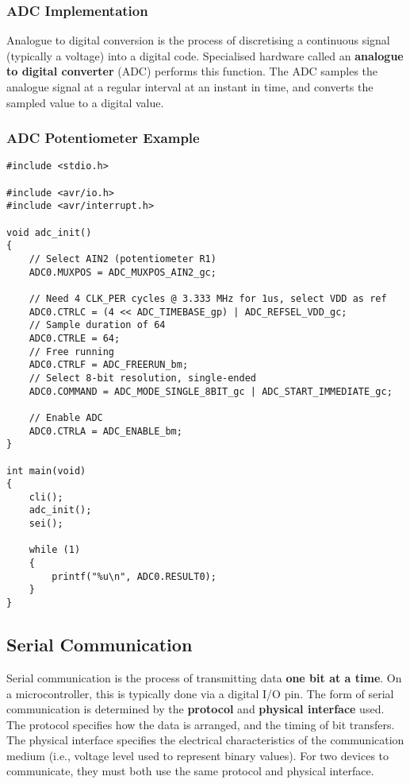 \documentclass{article}
\begin{document}
\subsubsection{ADC Implementation}
Analogue to digital conversion is the process of discretising a
continuous signal (typically a voltage) into a digital code.
Specialised hardware called an \textbf{analogue to digital converter}
(ADC) performs this function. The ADC samples the analogue signal at a
regular interval at an instant in time, and converts the sampled value
to a digital value.
\subsubsection{ADC Potentiometer Example}
\begin{verbatim}
#include <stdio.h>

#include <avr/io.h>
#include <avr/interrupt.h>

void adc_init()
{
    // Select AIN2 (potentiometer R1)
    ADC0.MUXPOS = ADC_MUXPOS_AIN2_gc;

    // Need 4 CLK_PER cycles @ 3.333 MHz for 1us, select VDD as ref
    ADC0.CTRLC = (4 << ADC_TIMEBASE_gp) | ADC_REFSEL_VDD_gc;
    // Sample duration of 64
    ADC0.CTRLE = 64;
    // Free running
    ADC0.CTRLF = ADC_FREERUN_bm;
    // Select 8-bit resolution, single-ended
    ADC0.COMMAND = ADC_MODE_SINGLE_8BIT_gc | ADC_START_IMMEDIATE_gc;

    // Enable ADC
    ADC0.CTRLA = ADC_ENABLE_bm;
}

int main(void)
{
    cli();
    adc_init();
    sei();

    while (1)
    {
        printf("%u\n", ADC0.RESULT0);
    }
}
\end{verbatim}
\subsection{Serial Communication}
Serial communication is the process of transmitting data \textbf{one
bit at a time}. On a microcontroller, this is typically done via a
digital I/O pin. The form of serial communication is determined by the
\textbf{protocol} and \textbf{physical interface} used. The protocol
specifies how the data is arranged, and the timing of bit transfers. The
physical interface specifies the electrical characteristics of the
communication medium (i.e., voltage level used to represent binary
values). For two devices to communicate, they must both use the same
protocol and physical interface.
\end{document}
